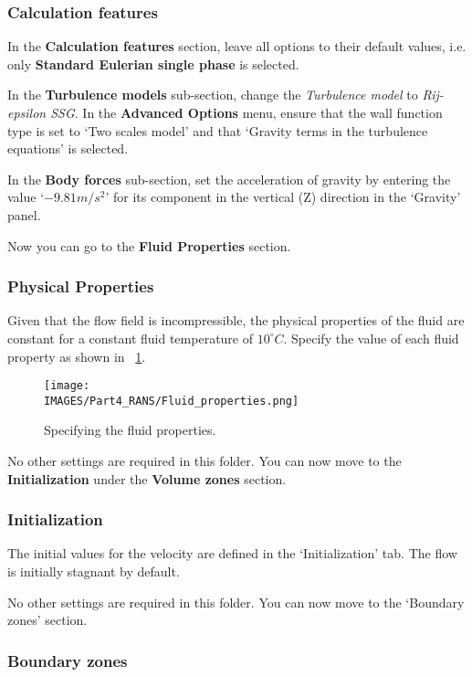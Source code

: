 \subsubsection{Calculation features}

In the \textbf{Calculation features} section, leave all options to their default values, i.e. only \textbf{Standard Eulerian single phase} is selected.

In the \textbf{Turbulence models} sub-section, change the \textit{Turbulence model} to \textit{Rij-epsilon SSG}.  In the \textbf{Advanced Options} menu, ensure that the wall function type is set to ‘Two scales model’ and that ‘Gravity terms in the turbulence equations’ is selected.

In the \textbf{Body forces} sub-section, set the acceleration of gravity by entering the value ‘$-9.81 m/s^2$’ for its component in the vertical (Z) direction in the ‘Gravity’ panel.

Now you can go to the \textbf{Fluid Properties} section.

\subsubsection{Physical Properties}

Given that the flow field is incompressible, the physical properties of the fluid are constant for a constant fluid temperature of \textbf{$10^{\circ}C$}.  Specify the value of each fluid property as shown in \figurename~\ref{lag:fluid_prop_gui}.
%
\begin{figure}[H]
\centering
\texttt{[image: \\IMAGES/Part4\_RANS/Fluid\_properties.png]}
\caption{Specifying the fluid properties.}\label{lag:fluid_prop_gui}
\end{figure}
%


No other settings are required in this folder.  You can now move to the \textbf{Initialization} under the \textbf{Volume zones} section.

\subsubsection{Initialization}

The initial values for the velocity are defined in the ‘Initialization’ tab. The flow is initially stagnant by default.

No other settings are required in this folder.  You can now move to the ‘Boundary zones’ section.

\subsubsection{Boundary zones}\label{lag:inlet_outlet_BCs}

